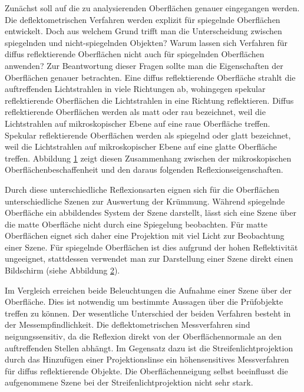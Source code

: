 Zunächst soll auf die zu analysierenden Oberflächen genauer eingegangen werden.
Die deflektometrischen Verfahren werden explizit für spiegelnde Oberflächen entwickelt.
Doch aus welchem Grund trifft man die Unterscheidung zwischen spiegelnden und nicht-spiegelnden Objekten?
Warum lassen sich Verfahren für diffus reflektierende Oberflächen nicht auch für spiegelnden Oberflächen anwenden?
Zur Beantwortung dieser Fragen sollte man die Eigenschaften der Oberflächen genauer betrachten.
Eine diffus reflektierende Oberfläche strahlt die auftreffenden Lichtstrahlen in viele Richtungen ab, wohingegen spekular reflektierende Oberflächen die Lichtstrahlen in eine Richtung reflektieren.
Diffus reflektierende Oberflächen werden als matt oder rau bezeichnet, weil die Lichtstrahlen auf mikroskopischer Ebene auf eine raue Oberfläche treffen.
Spekular reflektierende Oberflächen werden als spiegelnd oder glatt bezeichnet, weil die Lichtstrahlen auf mikroskopischer Ebene auf eine glatte Oberfläche treffen.
Abbildung \ref{tikz:abbGlattUndRau} zeigt diesen Zusammenhang zwischen der mikroskopischen Oberflächenbeschaffenheit und den daraus folgenden Reflexionseigenschaften.

{
	\begin{figure}[H]
		\centering
		
		\label{tikz:abbGlattUndRau}
	\end{figure}
}
%
\noindent
Durch diese unterschiedliche Reflexionsarten eignen sich für die Oberflächen unterschiedliche Szenen zur Auswertung der Krümmung.
Während spiegelnde Oberfläche ein abbildendes System der Szene darstellt, lässt sich eine Szene über die matte Oberfläche nicht durch eine Spiegelung beobachten.
Für matte Oberflächen eignet sich daher eine Projektion mit viel Licht zur Beobachtung einer Szene.
Für spiegelnde Oberflächen ist dies aufgrund der hohen Reflektivität ungeeignet, stattdessen verwendet man zur Darstellung einer Szene direkt einen Bildschirm (siehe Abbildung  \ref{tikz:abbDeflektometrieVSProjektion}).

{
	\begin{figure}[H]
		\centering
		
		\label{tikz:abbDeflektometrieVSProjektion}
	\end{figure}
}

\noindent
Im Vergleich erreichen beide Beleuchtungen die Aufnahme einer Szene über der Oberfläche.
Dies ist notwendig um bestimmte Aussagen über die Prüfobjekte treffen zu können.
Der wesentliche Unterschied der beiden Verfahren besteht in der Messempfindlichkeit.
Die deflektometrischen Messverfahren sind neigungssensitiv, da die Reflexion direkt von der Oberflächennormale an den auftreffenden Stellen abhängt.
Im Gegensatz dazu ist die Streifenlichtprojektion durch das Hinzufügen einer Projektionslinse ein höhensensitives Messverfahren für diffus reflektierende Objekte.
Die Oberflächenneigung selbst beeinflusst die aufgenommene Szene bei der Streifenlichtprojektion nicht sehr stark.

